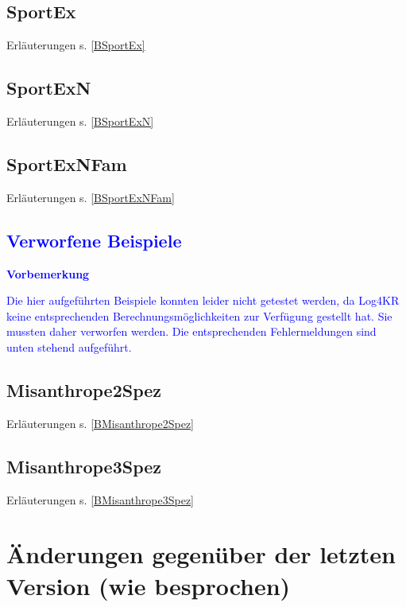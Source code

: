 \documentclass[a4paper, 11pt]{book}
\begin{document}
\section{SportEx} Erläuterungen s. \ref{BSportEx}
\label{SportEx}

\newpage


\section{SportExN} Erläuterungen s. \ref{BSportExN}
\label{SportExN}



\newpage

\section{SportExNFam} Erläuterungen s. \ref{BSportExNFam}
\label{SportExNFam}



\newpage


\textcolor{blue}{
\chapter{Verworfene Beispiele}
\label{examplesdep}
\textbf{Vorbemerkung}
}
\textcolor{blue}{
\noindent
Die hier aufgeführten Beispiele konnten leider nicht getestet werden, da Log4KR keine entsprechenden Berechnungsmöglichkeiten zur Verfügung gestellt hat. Sie mussten daher verworfen werden. Die entsprechenden Fehlermeldungen sind unten stehend aufgeführt.
}
\section{Misanthrope2Spez} Erläuterungen s. \ref{BMisanthrope2Spez}
\label{Misanthrope2Spez}


\newpage


\section{Misanthrope3Spez} Erläuterungen s. \ref{BMisanthrope3Spez}
\label{Misanthrope3Spez}


\chapter{Änderungen gegenüber der letzten Version (wie besprochen)}
\end{document}
